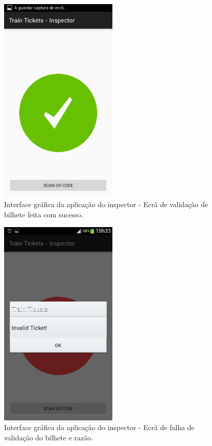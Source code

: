 \documentclass[12pt]{article}
\begin{document}
\begin{figure}[H]
	\centering
	\includegraphics[width=0.5\textwidth]{Screenshot_Inspector_Scan_Success_Icon.png}
	\caption{Interface gráfica da aplicação do inspector - Ecrã de validação de bilhete feita com sucesso.}
	\label{fig:c8}
\end{figure}

\begin{figure}[H]
	\centering
	\includegraphics[width=0.5\textwidth]{Screenshot_Inspector_Scan_Failed.png}
	\caption{Interface gráfica da aplicação do inspector - Ecrã de falha de validação do bilhete e razão.}
	\label{fig:c9}
\end{figure}
\end{document}
